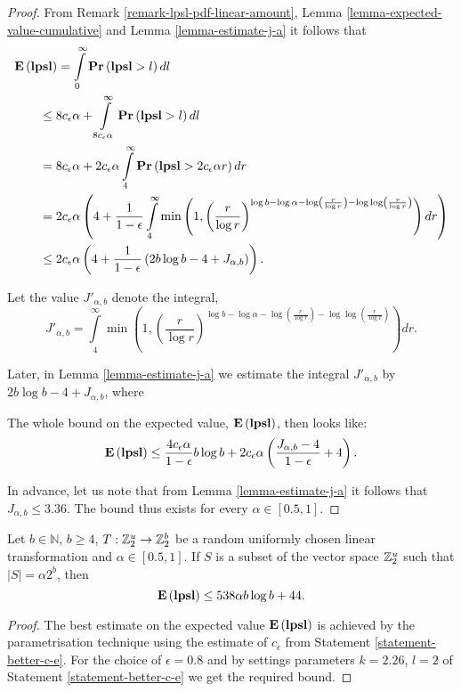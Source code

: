 \begin{proof}
From Remark \ref{remark-lpsl-pdf-linear-amount}, Lemma \ref{lemma-expected-value-cumulative} and Lemma \ref{lemma-estimate-j-a} it follows that
\[
\begin{split}
& \mathbf{E}\left(\mathbf{lpsl}\right)
	= \int\limits_0^\infty \mathbf{Pr}\left(\mathbf{lpsl} > l\right) dl \\ 
	& \qquad \leq 8 c_\epsilon \alpha + \int\limits_{8 c_\epsilon \alpha}^\infty \mathbf{Pr}\left(\mathbf{lpsl} > l\right) dl \\ 
	& \qquad = 8c_\epsilon \alpha + 2 c_\epsilon \alpha \int\limits_{4}^\infty \mathbf{Pr}\left(\mathbf{lpsl} > 2c_\epsilon \alpha r\right) dr \\
	& \qquad = 2c_\epsilon \alpha \left(4 + \frac{1}{1 - \epsilon} \int\limits_{4}^\infty \min\left(1, \left(\frac{r}{\log r}\right)^{\log b - \log \alpha - \log \left(\frac{r}{\log r}\right) - \log \log \left(\frac{r}{\log r}\right)}\right) dr \right) \\ 
	& \qquad \leq 2c_\epsilon \alpha \left( 4 + \frac{1}{1-\epsilon}\left( 2 b \log b - 4 + J_{\alpha, b} \right) \right) \text{.}
\end{split}
\]

Let the value $J'_{\alpha, b}$ denote the integral,
\begin{equation}
\label{equality-j-prime-a-b}
J'_{\alpha, b} = \int\limits_{4}^\infty \min\left(1, \left(\frac{r}{\log r}\right)^{\log b - \log \alpha - \log \left(\frac{r}{\log r}\right) - \log \log \left(\frac{r}{\log r}\right)}\right) dr \text{.}
\end{equation}

Later, in Lemma \ref{lemma-estimate-j-a} we estimate the integral $J'_{\alpha, b}$ by $2 b \log b - 4 +  J_{\alpha, b}$, where

The whole bound on the expected value, $\mathbf{E}\left(\mathbf{lpsl}\right)$, then looks like:
\[
\mathbf{E}\left(\mathbf{lpsl}\right) \leq \frac{4 c_\epsilon \alpha}{1 - \epsilon} b \log b + 2 c_\epsilon \alpha \left( \frac{J_{\alpha, b} - 4}{1 - \epsilon} + 4 \right) \text{.}
\]

In advance, let us note that from Lemma \ref{lemma-estimate-j-a} it follows that $J_{\alpha, b} \leq 3.36$. The bound thus exists for every $\alpha \in [0.5, 1]$.
\end{proof}

\begin{corollary}
\label{corollary-best-elpsl}
Let $b \in \mathbb{N}$, $b \geq 4$, $T: \mathbb{Z}_{2}^{u} \rightarrow \mathbb{Z}_{2}^{b}$ be a random uniformly chosen linear transformation and $\alpha \in \left[0.5, 1\right]$. If $S$ is a subset of the vector space $\mathbb{Z}_{2}^{u}$ such that $|S| = \alpha 2 ^ b$, then \[ \mathbf{E}\left(\mathbf{lpsl}\right) \leq 538 \alpha b \log b + 44 \text{.} \] 
\end{corollary}
\begin{proof}
The best estimate on the expected value $\mathbf{E}\left(\mathbf{lpsl}\right)$ is achieved by the parametrisation technique using the estimate of $c_\epsilon$ from Statement \ref{statement-better-c-e}. For the choice of $\epsilon = 0.8$ and by settings parameters $k = 2.26$, $l = 2$ of Statement \ref{statement-better-c-e} we get the required bound.
\end{proof}
